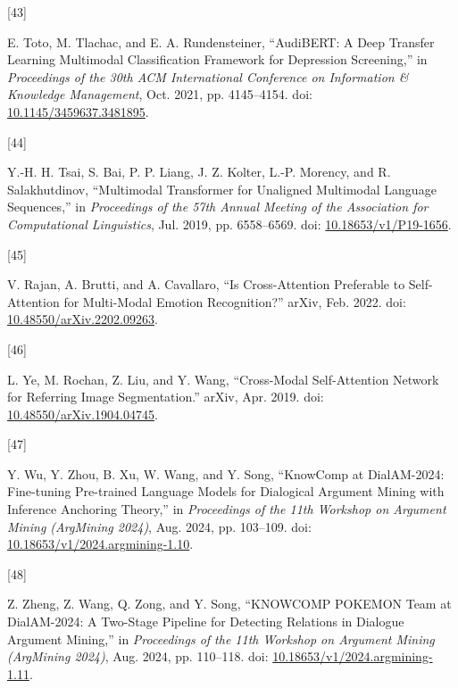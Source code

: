 \documentclass[twocolumn,twoside]{article}
\newlength{\cslhangindent}
\newlength{\csllabelwidth}
\newenvironment{CSLReferences}[2] %
 {\begin{list}{}{%
  \setlength{\itemindent}{0pt}
  \setlength{\leftmargin}{0pt}
  \setlength{\parsep}{0pt}
  \ifodd #1
   \setlength{\leftmargin}{\cslhangindent}
   \setlength{\itemindent}{-1\cslhangindent}
  \fi
  \setlength{\itemsep}{#2\baselineskip}}}
 {\end{list}}
\newcommand{\CSLLeftMargin}[1]{\parbox[t]{\csllabelwidth}{\strut#1\strut}}
\newcommand{\CSLRightInline}[1]{\parbox[t]{\linewidth - \csllabelwidth}{\strut#1\strut}}
\begin{document}
\begin{CSLReferences}{0}{0}
\CSLLeftMargin{{[}43{]} }%
\CSLRightInline{E. Toto, M. Tlachac, and E. A. Rundensteiner,
{``{AudiBERT}: {A Deep Transfer Learning Multimodal Classification
Framework} for {Depression Screening},''} in \emph{Proceedings of the
30th {ACM International Conference} on {Information} \& {Knowledge
Management}}, Oct. 2021, pp. 4145--4154. doi:
\href{https://doi.org/10.1145/3459637.3481895}{10.1145/3459637.3481895}.}

\CSLLeftMargin{{[}44{]} }%
\CSLRightInline{Y.-H. H. Tsai, S. Bai, P. P. Liang, J. Z. Kolter, L.-P.
Morency, and R. Salakhutdinov, {``Multimodal {Transformer} for
{Unaligned Multimodal Language Sequences},''} in \emph{Proceedings of
the 57th {Annual Meeting} of the {Association} for {Computational
Linguistics}}, Jul. 2019, pp. 6558--6569. doi:
\href{https://doi.org/10.18653/v1/P19-1656}{10.18653/v1/P19-1656}.}

\CSLLeftMargin{{[}45{]} }%
\CSLRightInline{V. Rajan, A. Brutti, and A. Cavallaro, {``Is
{Cross-Attention Preferable} to {Self-Attention} for {Multi-Modal
Emotion Recognition}?''} arXiv, Feb. 2022. doi:
\href{https://doi.org/10.48550/arXiv.2202.09263}{10.48550/arXiv.2202.09263}.}

\CSLLeftMargin{{[}46{]} }%
\CSLRightInline{L. Ye, M. Rochan, Z. Liu, and Y. Wang, {``Cross-{Modal
Self-Attention Network} for {Referring Image Segmentation}.''} arXiv,
Apr. 2019. doi:
\href{https://doi.org/10.48550/arXiv.1904.04745}{10.48550/arXiv.1904.04745}.}

\CSLLeftMargin{{[}47{]} }%
\CSLRightInline{Y. Wu, Y. Zhou, B. Xu, W. Wang, and Y. Song,
{``{KnowComp} at {DialAM-2024}: {Fine-tuning Pre-trained Language
Models} for {Dialogical Argument Mining} with {Inference Anchoring
Theory},''} in \emph{Proceedings of the 11th {Workshop} on {Argument
Mining} ({ArgMining} 2024)}, Aug. 2024, pp. 103--109. doi:
\href{https://doi.org/10.18653/v1/2024.argmining-1.10}{10.18653/v1/2024.argmining-1.10}.}

\CSLLeftMargin{{[}48{]} }%
\CSLRightInline{Z. Zheng, Z. Wang, Q. Zong, and Y. Song, {``{KNOWCOMP
POKEMON Team} at {DialAM-2024}: {A Two-Stage Pipeline} for {Detecting
Relations} in {Dialogue Argument Mining},''} in \emph{Proceedings of the
11th {Workshop} on {Argument Mining} ({ArgMining} 2024)}, Aug. 2024, pp.
110--118. doi:
\href{https://doi.org/10.18653/v1/2024.argmining-1.11}{10.18653/v1/2024.argmining-1.11}.}


\end{CSLReferences}
\end{document}
